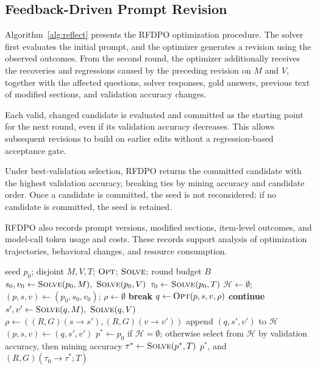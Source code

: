 \documentclass[11pt]{article}
\begin{document}
\subsection{Feedback-Driven Prompt Revision}
\label{sec:optimization}

Algorithm~\ref{alg:reflect} presents the RFDPO optimization procedure. The solver first evaluates the initial prompt, and the optimizer generates a revision using the observed outcomes. From the second round, the optimizer additionally receives the recoveries and regressions caused by the preceding revision on $M$ and $V$, together with the affected questions, solver responses, gold answers, previous text of modified sections, and validation accuracy changes.

Each valid, changed candidate is evaluated and committed as the starting point for the next round, even if its validation accuracy decreases. This allows subsequent revisions to build on earlier edits without a regression-based acceptance gate.

Under best-validation selection, RFDPO returns the committed candidate with the highest validation accuracy, breaking ties by mining accuracy and candidate order. Once a candidate is committed, the seed is not reconsidered; if no candidate is committed, the seed is retained.

RFDPO also records prompt versions, modified sections, item-level outcomes, and model-call token usage and costs. These records support analysis of optimization trajectories, behavioral changes, and resource consumption.

\begin{algorithm}[!t]
\caption{RFDPO optimization with edit-effect feedback}
\label{alg:reflect}
\small
\begin{algorithmic}[1]
\Require seed $p_0$; disjoint $M,V,T$; $\textsc{Opt}$; $\textsc{Solve}$; round budget $B$
\State $s_0,v_0 \gets \textsc{Solve}(p_0,M),\ \textsc{Solve}(p_0,V)$
\State $\tau_0 \gets \textsc{Solve}(p_0,T)$ 
\State $\mathcal{H}\gets\emptyset$; $(p,s,v)\gets(p_0,s_0,v_0)$; $\rho\gets\emptyset$
   \State \textbf{break} \EndIf
  \State $q\gets\textsc{Opt}(p,s,v,\rho)$ 
   \State \textbf{continue} \EndIf
  \State $s',v'\gets\textsc{Solve}(q,M),\ \textsc{Solve}(q,V)$
  \State $\rho\gets((R,G)(s\!\to\!s'),(R,G)(v\!\to\!v'))$
  \State append $(q,s',v')$ to $\mathcal{H}$ 
  \State $(p,s,v)\gets(q,s',v')$
\EndFor
\State $p^*\gets p_0$ if $\mathcal{H}=\emptyset$; otherwise select from $\mathcal{H}$
\Statex \hspace{\algorithmicindent} by validation accuracy, then mining accuracy
\State $\tau^* \gets \textsc{Solve}(p^*,T)$ 
\State \Return $p^*$, and $(R,G)(\tau_0\!\to\!\tau^*;T)$
\end{algorithmic}
\end{algorithm}
\end{document}
